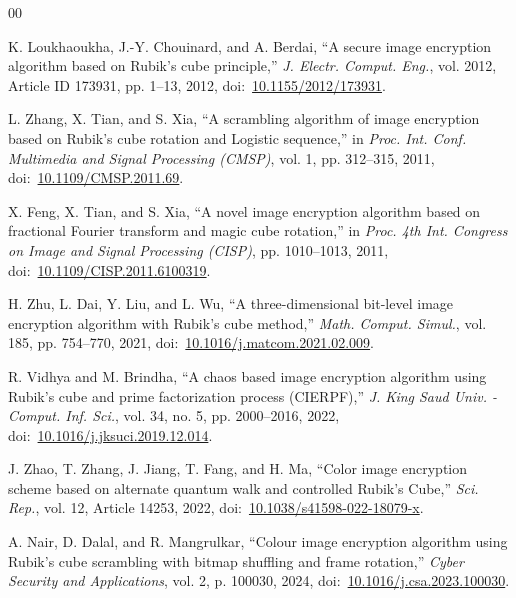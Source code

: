 \documentclass[10pt,twocolumn]{article}
\begin{document}
\begin{thebibliography}{00}
\small
\setlength{\itemsep}{1.5pt plus 0.5pt minus 0.5pt}

K. Loukhaoukha, J.-Y. Chouinard, and A. Berdai, ``A secure image encryption algorithm based on Rubik's cube principle,'' \textit{J. Electr. Comput. Eng.}, vol. 2012, Article ID 173931, pp. 1--13, 2012, doi:~\href{https://doi.org/10.1155/2012/173931}{10.1155/2012/173931}.

L. Zhang, X. Tian, and S. Xia, ``A scrambling algorithm of image encryption based on Rubik's cube rotation and Logistic sequence,'' in \textit{Proc. Int. Conf. Multimedia and Signal Processing (CMSP)}, vol. 1, pp. 312--315, 2011, doi:~\href{https://doi.org/10.1109/CMSP.2011.69}{10.1109/CMSP.2011.69}.

X. Feng, X. Tian, and S. Xia, ``A novel image encryption algorithm based on fractional Fourier transform and magic cube rotation,'' in \textit{Proc. 4th Int. Congress on Image and Signal Processing (CISP)}, pp. 1010--1013, 2011, doi:~\href{https://doi.org/10.1109/CISP.2011.6100319}{10.1109/CISP.2011.6100319}.

H. Zhu, L. Dai, Y. Liu, and L. Wu, ``A three-dimensional bit-level image encryption algorithm with Rubik's cube method,'' \textit{Math. Comput. Simul.}, vol. 185, pp. 754--770, 2021, doi:~\href{https://doi.org/10.1016/j.matcom.2021.02.009}{10.1016/j.matcom.2021.02.009}.

R. Vidhya and M. Brindha, ``A chaos based image encryption algorithm using Rubik's cube and prime factorization process (CIERPF),'' \textit{J. King Saud Univ. - Comput. Inf. Sci.}, vol. 34, no. 5, pp. 2000--2016, 2022, doi:~\href{https://doi.org/10.1016/j.jksuci.2019.12.014}{10.1016/j.jksuci.2019.12.014}.

J. Zhao, T. Zhang, J. Jiang, T. Fang, and H. Ma, ``Color image encryption scheme based on alternate quantum walk and controlled Rubik's Cube,'' \textit{Sci. Rep.}, vol. 12, Article 14253, 2022, doi:~\href{https://doi.org/10.1038/s41598-022-18079-x}{10.1038/s41598-022-18079-x}.

A. Nair, D. Dalal, and R. Mangrulkar, ``Colour image encryption algorithm using Rubik's cube scrambling with bitmap shuffling and frame rotation,'' \textit{Cyber Security and Applications}, vol. 2, p. 100030, 2024, doi:~\href{https://doi.org/10.1016/j.csa.2023.100030}{10.1016/j.csa.2023.100030}.


\end{thebibliography}
\end{document}

